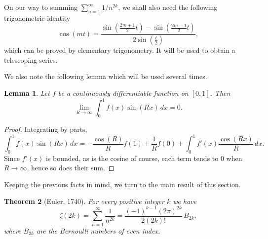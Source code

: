 \documentclass[11pt, oneside]{article}
\theoremstyle{plain}
\newtheorem{theorem}{Theorem}
\newtheorem{lemma}[theorem]{Lemma}
\theoremstyle{definition}
\begin{document}
On our way to summing $\sum_{n=1}^{\infty} 1/n^{2k}$, we shall also need the following trigonometric identity
\begin{equation}
\label{eq:idtrig}
  \cos(mt) = \frac{\sin(\frac{2m+1}{2}t)-\sin(\frac{2m-1}{2}t)}{2\sin(\frac{t}{2})},
\end{equation}
which can be proved by elementary trigonometry. It will be used to obtain a telescoping series.

We also note the following lemma which will be used several times.

\begin{lemma}
\label{lem:RL}
Let $f$ be a continuously differentiable function on $[0, 1]$. Then
\[
\lim_{R \to \infty} \int_0^{1} f(x) \sin(R x)\,dx = 0.
\]
\end{lemma} 

\begin{proof}
Integrating by parts,
\[
  \int_0^1 f(x) \sin(Rx)\,dx 
  = - \frac{\cos(R)}{R} f(1) + \frac{1}{R} f(0) + \int_0^1 f'(x) \frac{\cos(Rx)}{R} \,dx.
\]
Since $f'(x)$ is bounded, as is the cosine of course, each term tends to $0$ when $R \to \infty$, hence so does their sum.
\end{proof}

Keeping the previous facts in mind, we turn to the main result of this section.

\begin{theorem}[Euler, 1740]
\label{teo:zeta2k}
For every positive integer $k$ we have
\begin{equation}
\label{eq:zeta2k}
  \zeta(2k) = \sum_{n=1}^\infty \frac{1}{n^{2k}} = \frac{(-1)^{k-1} (2\pi)^{2k}}{2(2k)!} \,B_{2k},
\end{equation}
where $B_{2k}$ are the Bernoulli numbers of even index.
\end{theorem}
\end{document}

